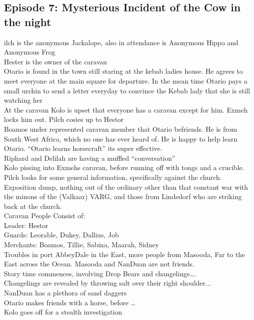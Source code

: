 \subsection{Episode 7: Mysterious Incident of the Cow in the night}
ilch is the anonymous Jackalope, also in attendance is Anonymous Hippo and Anonymous Frog\\
Hester is the owner of the caravan\\
Otario is found in the town still staring at the kebab ladies house. He agrees to meet everyone at the main square for departure. In the mean time Otario pays a small urchin to send a letter everyday to convince the Kebab lady that she is still watching her\\
At the caravan Kolo is upset that everyone has a caravan except for him. Exmeh locks him out. Pilch cosies up to Hestor\\
Boamos under represented caravan member that Otario befriends. He is from South West Africa, which no one has ever heard of. He is happy to help learn Otario. “Otario learns horsecraft” its super effective.\\
Riphard and Delilah are having a muffled “conversation”\\
Kolo pissing into Exmehs caravan, before running off with tongs and a crucible.\\
Pilch looks for some general information, specifically against the church. Exposition dump, nothing out of the ordinary other than that constant war with the minons of the (Valkaar) VARG, and those from Lindedorf who are striking back at the church.\\
Caravan People Consist of:\\
Leader: Hestor\\
Guards: Leorable, Dukey, Dallius, Job\\
Merchants: Boamos, Tillie, Sabina, Maarah, Sidney\\
Troubles in port AbbeyDale in the East, more people from Masooda, Far to the East across the Ocean. Masooda and NanDuan are not friends.\\
Story time commences, involving Drop Bears and changelings….\\
Changelings are revealed by throwing salt over their right shoulder...\\
NanDuan has a plethora of sand daggers\\
Otario makes friends with a horse, before …\\
Kolo goes off for a stealth investigation\\
